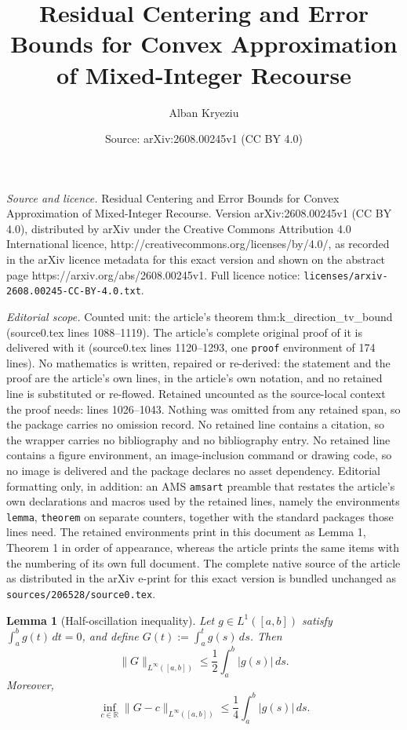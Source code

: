 \documentclass[10pt,a4paper]{amsart}
\title{Residual Centering and Error Bounds for Convex Approximation of Mixed-Integer Recourse}
\author{Alban Kryeziu}
\date{Source: arXiv:2608.00245v1 (CC BY 4.0)}
\newtheorem{lemma}{Lemma}
\begin{document}
\maketitle

\noindent\emph{Source and licence.} Residual Centering and Error Bounds for Convex Approximation of Mixed-Integer Recourse. Version arXiv:2608.00245v1 (CC BY 4.0), distributed by arXiv under the Creative Commons Attribution 4.0 International licence, http://creativecommons.org/licenses/by/4.0/, as recorded in the arXiv licence metadata for this exact version and shown on the abstract page https://arxiv.org/abs/2608.00245v1. Full licence notice: \texttt{licenses/arxiv-2608.00245-CC-BY-4.0.txt}.\par\smallskip

\noindent\textit{Editorial scope.} Counted unit: the article's theorem thm:k\_direction\_tv\_bound (source0.tex lines 1088--1119). The article's complete original proof of it is delivered with it (source0.tex lines 1120--1293, one \texttt{proof} environment of 174 lines). No mathematics is written, repaired or re-derived: the statement and the proof are the article's own lines, in the article's own notation, and no retained line is substituted or re-flowed.  Retained uncounted as the source-local context the proof needs: lines 1026--1043.  Nothing was omitted from any retained span, so the package carries no omission record.  No retained line contains a citation, so the wrapper carries no bibliography and no bibliography entry.  No retained line contains a figure environment, an image-inclusion command or drawing code, so no image is delivered and the package declares no asset dependency.  Editorial formatting only, in addition: an AMS \texttt{amsart} preamble that restates the article's own declarations and macros used by the retained lines, namely the environments \texttt{lemma}, \texttt{theorem} on separate counters, together with the standard packages those lines need.  The retained environments print in this document as Lemma 1, Theorem 1 in order of appearance, whereas the article prints the same items with the numbering of its own full document.  The complete native source of the article as distributed in the arXiv e-print for this exact version is bundled unchanged as \texttt{sources/206528/source0.tex}.
\begin{lemma}[Half-oscillation inequality]
\label{lem:half_oscillation}
Let $g\in L^1([a,b])$ satisfy $\int_a^b g(t)\,dt=0$, and define
$G(t):=\int_a^t g(s)\,ds$. Then
\begin{equation}
\label{eq:half_oscillation}
\|G\|_{L^\infty([a,b])}
\le
\frac12\int_a^b |g(s)|\,ds.
\end{equation}
Moreover,
\begin{equation}
\label{eq:recentered_half_oscillation}
\inf_{c\in\mathbb R}\|G-c\|_{L^\infty([a,b])}
\le
\frac14\int_a^b |g(s)|\,ds.
\end{equation}
\end{lemma}
\end{document}
